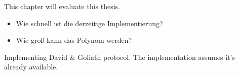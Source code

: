 \label{sec:evaluation}

This chapter will evaluate this thesis.

\begin{JWtodoBox}

\begin{itemize}

\item Wie schnell ist die derzeitige Implementierung?

\item Wie groß kann das Polynom werden?

\end{itemize}

\end{JWtodoBox}



Implementing David \& Goliath protocol. The implementation assumes it's already
available.
